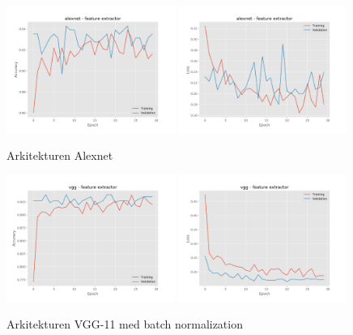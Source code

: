 \documentclass{kththesis}
\begin{document}
    \begin{figure}
      \centering
      \includegraphics[width=0.49\textwidth]{"./balcony/balcony-20split - acc - alexnet - feature extractor"}
      \includegraphics[width=0.49\textwidth]{"./balcony/balcony-20split - loss - alexnet - feature extractor"}
      \caption{Arkitekturen Alexnet}
    \end{figure}

    \begin{figure}
      \centering
      \includegraphics[width=0.49\textwidth]{"./balcony/balcony-20split - acc - vgg - feature extractor"}
      \includegraphics[width=0.49\textwidth]{"./balcony/balcony-20split - loss - vgg - feature extractor"}
      \caption{Arkitekturen VGG-11 med batch normalization}
    \end{figure}
\end{document}
